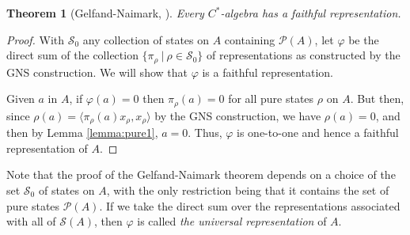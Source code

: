 \documentclass[12pt,a4paper]{report}
\theoremstyle{plain}
\newtheorem{thm}{Theorem}
\theoremstyle{definition}
\newcommand{\1}{\mathbbm{1}}
\renewcommand{\phi}{\varphi}
\renewcommand{\S}{\mathscr{S}}
\renewcommand{\P}[1]{\mathscr{P}(#1)}
\begin{document}
\begin{thm}[Gelfand-Naimark, {\cite[4.5.6]{kadison83}}] \label{thm:gn}
	Every $C^\ast$-algebra has a faithful representation.
\end{thm}
\begin{proof}
	With $\S_0$ any collection of states on $A$ containing $\P{A}$, let $\phi$ be the direct sum of
	the collection $\{\pi_\rho ~|~ \rho\in\S_0\}$ of representations as constructed by the GNS
	construction. We will show that $\phi$ is a faithful representation.
	
	Given $a$ in $A$, if $\phi(a)=0$ then $\pi_\rho(a)=0$ for all pure states $\rho$ on $A$. But then,
	since $\rho(a)=\langle \pi_\rho (a) x_\rho, x_\rho \rangle$ by the GNS construction, we have 
	$\rho(a)=0$, and then by Lemma \ref{lemma:pure1}, $a=0$. Thus, $\phi$ is one-to-one and hence a 
	faithful representation of $A$.
\end{proof}

Note that the proof of the Gelfand-Naimark theorem depends on a choice of the set $\S_0$ of states on 
$A$, with the only restriction being that it contains the set of pure states $\P A$. If we take the 
direct sum over the representations associated with all of $\S (A)$, then $\phi$ is called \emph{the 
universal representation} of $A$.
\end{document}
